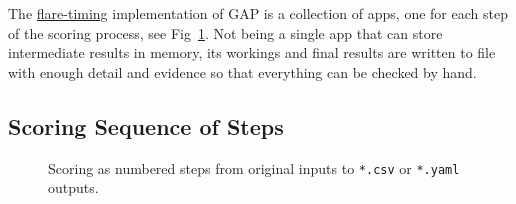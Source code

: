 \documentclass[gap.tex]{subfiles}
\begin{document}
The \href{https://github.com/BlockScope/flare-timing}{flare-timing}
implementation of GAP is a collection of apps, one for each step of the scoring
process, see Fig~\ref{fig:flare-timing}. Not being a single app that can store
intermediate results in memory, its workings and final results are written to
file with enough detail and evidence so that everything can be checked by hand.

\subsection{Scoring Sequence of Steps}

\begin{figure}[!ht]
    \centering
    
    \caption{Scoring as numbered steps from {\color{blue}original inputs} to
    {\color{csv}\texttt{*.csv}} or \texttt{*.yaml} outputs.}
    \label{fig:flare-timing}
\end{figure}
\end{document}
